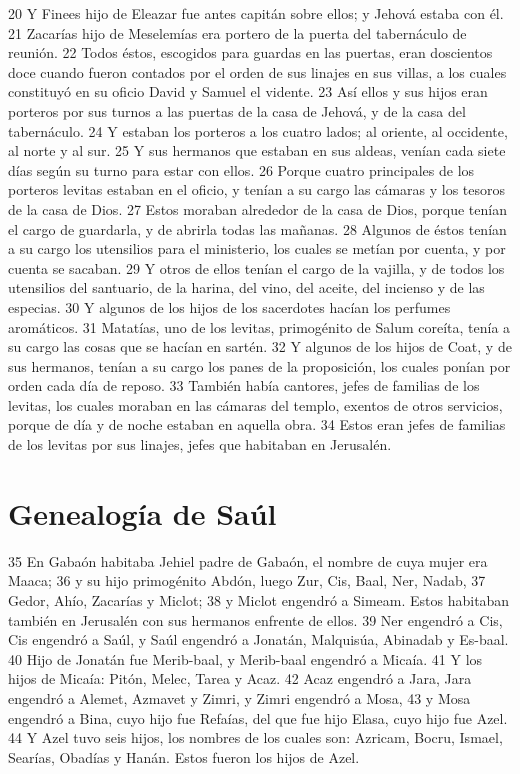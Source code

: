 20 Y Finees hijo de Eleazar fue antes capitán sobre ellos; y Jehová estaba con él.
21 Zacarías hijo de Meselemías era portero de la puerta del tabernáculo de reunión.
22 Todos éstos, escogidos para guardas en las puertas, eran doscientos doce cuando fueron contados por el orden de sus linajes en sus villas, a los cuales constituyó en su oficio David y Samuel el vidente.
23 Así ellos y sus hijos eran porteros por sus turnos a las puertas de la casa de Jehová, y de la casa del tabernáculo.
24 Y estaban los porteros a los cuatro lados; al oriente, al occidente, al norte y al sur.
25 Y sus hermanos que estaban en sus aldeas, venían cada siete días según su turno para estar con ellos.
26 Porque cuatro principales de los porteros levitas estaban en el oficio, y tenían a su cargo las cámaras y los tesoros de la casa de Dios.
27 Estos moraban alrededor de la casa de Dios, porque tenían el cargo de guardarla, y de abrirla todas las mañanas.
28 Algunos de éstos tenían a su cargo los utensilios para el ministerio, los cuales se metían por cuenta, y por cuenta se sacaban.
29 Y otros de ellos tenían el cargo de la vajilla, y de todos los utensilios del santuario, de la harina, del vino, del aceite, del incienso y de las especias.
30 Y algunos de los hijos de los sacerdotes hacían los perfumes aromáticos.
31 Matatías, uno de los levitas, primogénito de Salum coreíta, tenía a su cargo las cosas que se hacían en sartén.
32 Y algunos de los hijos de Coat, y de sus hermanos, tenían a su cargo los panes de la proposición, los cuales ponían por orden cada día de reposo.
33 También había cantores, jefes de familias de los levitas, los cuales moraban en las cámaras del templo, exentos de otros servicios, porque de día y de noche estaban en aquella obra.
34 Estos eran jefes de familias de los levitas por sus linajes, jefes que habitaban en Jerusalén.
\section*{Genealogía de Saúl}

35 En Gabaón habitaba Jehiel padre de Gabaón, el nombre de cuya mujer era Maaca;
36 y su hijo primogénito Abdón, luego Zur, Cis, Baal, Ner, Nadab,
37 Gedor, Ahío, Zacarías y Miclot;
38 y Miclot engendró a Simeam. Estos habitaban también en Jerusalén con sus hermanos enfrente de ellos.
39 Ner engendró a Cis, Cis engendró a Saúl, y Saúl engendró a Jonatán, Malquisúa, Abinadab y Es-baal.
40 Hijo de Jonatán fue Merib-baal, y Merib-baal engendró a Micaía.
41 Y los hijos de Micaía: Pitón, Melec, Tarea y Acaz.
42 Acaz engendró a Jara, Jara engendró a Alemet, Azmavet y Zimri, y Zimri engendró a Mosa,
43 y Mosa engendró a Bina, cuyo hijo fue Refaías, del que fue hijo Elasa, cuyo hijo fue Azel.
44 Y Azel tuvo seis hijos, los nombres de los cuales son: Azricam, Bocru, Ismael, Searías, Obadías y Hanán. Estos fueron los hijos de Azel.

